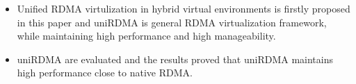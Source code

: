 \begin{itemize}
\item Unified RDMA virtulization in hybrid virtual environments is firstly proposed in this paper and uniRDMA is general RDMA virtualization framework,  while maintaining high performance and high manageability.

\item uniRDMA are evaluated and the results proved that uniRDMA maintains high performance close to native RDMA.
\end{itemize}
